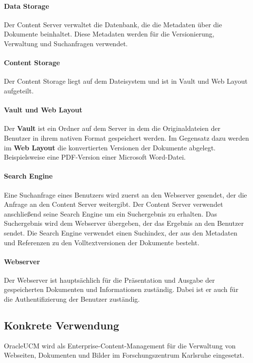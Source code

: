 \paragraph{Data Storage} Der Content Server verwaltet die Datenbank, die die Metadaten über die Dokumente beinhaltet.
Diese Metadaten werden für die Versionierung, Verwaltung und Suchanfragen verwendet.

\paragraph{Content Storage} Der Content Storage liegt auf dem Dateisystem und ist in Vault und Web Layout aufgeteilt.

\paragraph{Vault und Web Layout}
Der \textbf{Vault} ist ein Ordner auf dem Server in dem die Originaldateien der Benutzer in ihrem nativen Format gespeichert werden.
Im Gegensatz dazu werden im \textbf{Web Layout} die konvertierten Versionen der Dokumente abgelegt. Beispielsweise eine \gls{PDF}-Version einer Microsoft Word-Datei.

\paragraph{Search Engine}
Eine Suchanfrage eines Benutzers wird zuerst an den Webserver gesendet, der die Anfrage an den Content Server weitergibt.
Der Content Server verwendet anschließend seine Search Engine um ein Suchergebnis zu erhalten.
Das Suchergebnis wird dem Webserver übergeben, der das Ergebnis an den Benutzer sendet.
Die Search Engine verwendet einen Suchindex, der aus den Metadaten und Referenzen zu den Volltextversionen der Dokumente besteht.

\paragraph{Webserver}
Der Webserver ist hauptsächlich für die Präsentation und Ausgabe der gespeicherten Dokumenten und Informationen zuständig.
Dabei ist er auch für die Authentifizierung der Benutzer zuständig.


\subsection{Konkrete Verwendung}

\gls{OracleUCM} wird als Enterprise-Content-Management für die Verwaltung von Webseiten, Dokumenten und Bilder im Forschungszentrum Karlsruhe eingesetzt.

